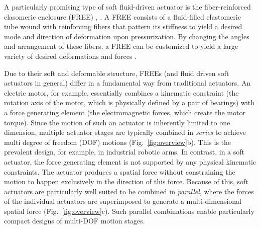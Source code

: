 A particularly promising type of soft fluid-driven actuator is the fiber-reinforced elasomeric enclosure (FREE) \cite{bishop2015design, krishnan2012evaluating, bishop2013force}, .
A FREE consists of a fluid-filled elastomeric tube wound with reinforcing fibers that pattern its stiffness to yield a desired mode and direction of deformation upon pressurization. %
By changing the angles and arrangement of these fibers, a FREE can be customized to yield a large variety of desired deformations and forces \cite{bishop2015design}. 



Due to their soft and deformable structure, FREEs (and fluid driven soft actuators in general) differ in a fundamental way from traditional actuators.
An electric motor, for example, essentially combines a kinematic constraint (the rotation axis of the motor, which is physically defined by a pair of bearings) with a force generating element (the electromagnetic forces, which create the motor torque).
Since the motion of such an actuator is inherently limited to one dimension, multiple actuator stages are typically combined in \emph{series} to achieve multi degree of freedom (DOF) motions (Fig.~\ref{fig:overview}b). 
This is the prevalent design, for example, in industrial robotic arms.
In contrast, in a soft actuator, the force generating element is not supported by any physical kinematic constraints.
The actuator produces a spatial force without constraining the motion to happen exclusively in the direction of this force.
Because of this, soft actuators are particularly well suited to be combined in \emph{parallel}, where the forces of the individual actuators are superimposed to generate a multi-dimensional spatial force (Fig.~\ref{fig:overview}c).
Such parallel combinations enable particularly compact designs of multi-DOF motion stages.


